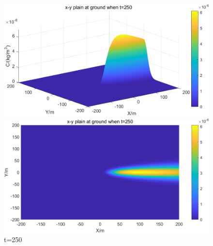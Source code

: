 \documentclass{article}
\begin{document}
	
	\begin{figure}[htbp]
		\begin{minipage}{0.49\textwidth}
			\includegraphics[width=\textwidth]{pics/default,t=250,3D.png}
		\end{minipage}
		\begin{minipage}{0.49\textwidth}
			\includegraphics[width=\textwidth]{pics/default,t=250,2D.png}
		\end{minipage}
		\caption{t=250}
		\label{fig5}
	\end{figure}
\end{document}
